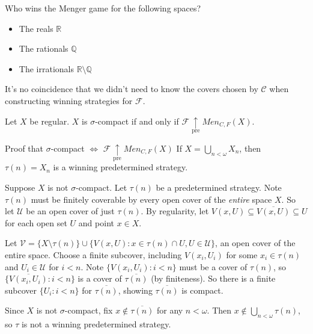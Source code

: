\documentclass{beamer}
\theoremstyle{definition}
\newcommand{\prewin}{\underset{\text{pre}}{\uparrow}}
\newcommand{\menGame}[1]{Men_{C,F}\left({#1}\right)}
\newcommand{\cl}[1]{\overline{#1}}
\newcommand{\<}{\langle}
\renewcommand{\>}{\rangle}
\newcommand{\mc}[1]{\mathcal{#1}}
\newcommand{\mb}[1]{\mathbb{#1}}
\newcommand{\pl}[1]{\mathscr{#1}}
\begin{document}
\begin{frame}
  Who wins the Menger game for the following spaces?
  \begin{itemize}
    \item The reals \(\mb R\)
    \pause
    \item The rationals \(\mb Q\)
    \pause
    \item The irrationals \(\mb R\setminus\mb Q\)
  \end{itemize}
\end{frame}

\begin{frame}
  It's no coincidence that we didn't need to know the covers chosen by
  \(\pl C\) when constructing winning strategies for \(\pl F\).

  \pause

  \begin{theorem}[C]
    Let \(X\) be regular. \(X\) is \(\sigma\)-compact if and only if
    \(\pl F\prewin\menGame X\).
  \end{theorem}
\end{frame}

\begin{frame}{
  Proof that \(\sigma\)-compact \(\Leftrightarrow\)
  \(\pl F\prewin\menGame X\)
}\small
  If \(X=\bigcup_{n<\omega} X_n\), then \(\tau(n)=X_n\) is a winning
  predetermined strategy.

  \vpause

  Suppose \(X\) is not \(\sigma\)-compact.
  Let \(\tau(n)\) be a predetermined strategy.
  Note \(\tau(n)\) must be finitely coverable by every open cover of the
  \textit{entire} space \(X\).
  So let \(\mc U\) be an open cover of just \(\tau(n)\). By regularity,
  let \(V(x,U)\subseteq\cl{V(x,U)}\subseteq U\) for each open set \(U\)
  and point \(x\in X\).

  \vpause

  Let
  \(\mc V=\{X\setminus\tau(n)\}\cup\{V(x,U):x\in\tau(n)\cap U,U\in\mc U\}\),
  an open cover
  of the entire space. Choose a finite subcover, including \(V(x_i,U_i)\) for
  some \(x_i\in\tau(n)\) and \(U_i\in\mc U\) for
  \(i<n\). Note \(\{V(x_i,U_i):i<n\}\) must be a cover of \(\tau(n)\), so
  \(\{\cl{V(x_i,U_i)}:i<n\}\) is a cover of \(\cl{\tau(n)}\) (by finiteness).
  So there is a finite subcover \(\{U_i:i<n\}\) for \(\cl{\tau(n)}\), showing
  \(\cl{\tau(n)}\) is compact.

  \vpause

  Since \(X\) is not \(\sigma\)-compact, fix
  \(x \not\in \cl{\tau(n)}\) for any
  \(n<\omega\). Then \(x\not\in\bigcup_{n<\omega}\tau(n)\), so \(\tau\)
  is not a winning predetermined strategy.
\end{frame}
\end{document}
